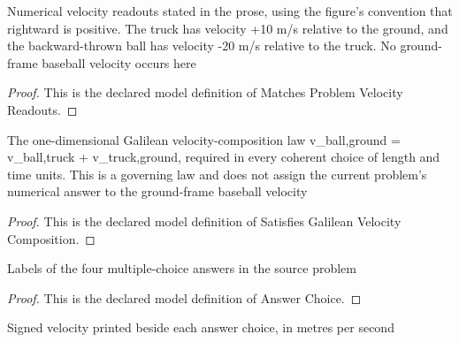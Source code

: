 \begin{definition}
  \label{def:physics:phyx-mini-0523:phyxminiproblems-problemphyxmini0523-matchesproblemvelocityreadouts}
  Numerical velocity readouts stated in the prose, using the figure's convention that rightward is positive. The truck has velocity +10 m/s relative to the ground, and the backward-thrown ball has velocity -20 m/s relative to the truck. No ground-frame baseball velocity occurs here
\end{definition}
\begin{proof}
  This is the declared model definition of Matches Problem Velocity Readouts.
\end{proof}
\begin{definition}
  \label{def:physics:phyx-mini-0523:phyxminiproblems-problemphyxmini0523-satisfiesgalileanvelocitycomposition}
  The one-dimensional Galilean velocity-composition law v\_ball,ground = v\_ball,truck + v\_truck,ground, required in every coherent choice of length and time units. This is a governing law and does not assign the current problem's numerical answer to the ground-frame baseball velocity
\end{definition}
\begin{proof}
  This is the declared model definition of Satisfies Galilean Velocity Composition.
\end{proof}
\begin{definition}
  \label{def:physics:phyx-mini-0523:phyxminiproblems-problemphyxmini0523-answerchoice}
  Labels of the four multiple-choice answers in the source problem
\end{definition}
\begin{proof}
  This is the declared model definition of Answer Choice.
\end{proof}
\begin{definition}
  \label{def:physics:phyx-mini-0523:phyxminiproblems-problemphyxmini0523-displayedvelocityinmeterspersecond}
  Signed velocity printed beside each answer choice, in metres per second
\end{definition}
